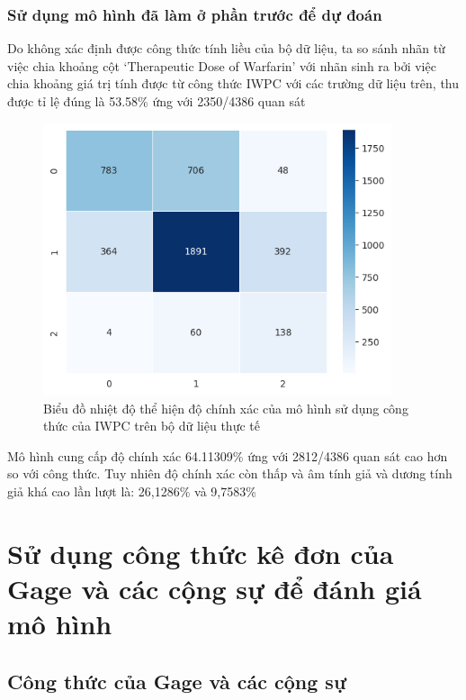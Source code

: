 \documentclass[14pt,oneside]{scrbook}
\begin{document}
\subsubsection{Sử dụng mô hình đã làm ở phần trước để dự
đoán}\label{sux1eed-dux1ee5ng-muxf4-huxecnh-ux111uxe3-luxe0m-ux1edf-phux1ea7n-trux1b0ux1edbc-ux111ux1ec3-dux1ef1-ux111ouxe1n}

Do không xác định được công thức tính liều của bộ dữ liệu, ta so sánh
nhãn từ việc chia khoảng cột `Therapeutic Dose of Warfarin' với nhãn
sinh ra bởi việc chia khoảng giá trị tính được từ công thức IWPC với các
trường dữ liệu trên, thu được tỉ lệ đúng là 53.58\% ứng với 2350/4386
quan sát

\begin{figure}
\centering
\includegraphics[width=\textwidth,height=8cm]{image/iwpc_heatmap_real.png}
\caption{Biểu đồ nhiệt độ thể hiện độ chính xác của mô hình sử dụng công
thức của IWPC trên bộ dữ liệu thực tế}
\end{figure}

Mô hình cung cấp độ chính xác 64.11309\% ứng với 2812/4386 quan sát cao
hơn so với công thức. Tuy nhiên độ chính xác còn thấp và âm tính giả và
dương tính giả khá cao lần lượt là: 26,1286\% và 9,7583\%

\section{Sử dụng công thức kê đơn của Gage và các cộng sự để đánh giá mô
hình}\label{sux1eed-dux1ee5ng-cuxf4ng-thux1ee9c-kuxea-ux111ux1a1n-cux1ee7a-gage-vuxe0-cuxe1c-cux1ed9ng-sux1ef1-ux111ux1ec3-ux111uxe1nh-giuxe1-muxf4-huxecnh}

\subsection{Công thức của Gage và các cộng
sự}\label{cuxf4ng-thux1ee9c-cux1ee7a-gage-vuxe0-cuxe1c-cux1ed9ng-sux1ef1}
\end{document}
